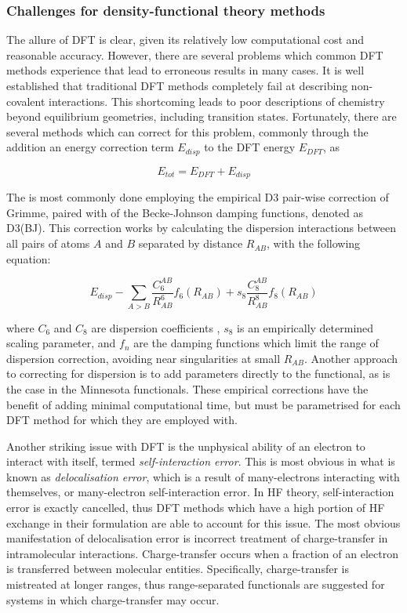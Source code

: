 \subsubsection{Challenges for density-functional theory methods}

The allure of DFT is clear, given its relatively low computational cost and reasonable accuracy. However, there are several problems which common DFT methods experience that lead to erroneous results in many cases.\cite{Cohen2012} It is well established that traditional DFT methods completely fail at describing non-covalent interactions.\cite{DiLabio2016} This shortcoming leads to poor descriptions of chemistry beyond equilibrium geometries, including transition states. Fortunately, there are several methods which can correct for this problem, commonly through the addition an energy correction term $E_{disp}$ to the DFT energy $E_{DFT}$, as

\begin{equation}
  E_{tot} = E_{DFT} + E_{disp}
\end{equation}

\noindent The is most commonly done employing the empirical D3 pair-wise correction of Grimme,\cite{Grimme2010} paired with of the Becke-Johnson damping functions,\cite{Johnson2006} denoted as D3(BJ). This correction works by calculating the dispersion interactions between all pairs of atoms $A$ and $B$ separated by distance $R_{AB}$, with the following equation:

\begin{equation}
  E_{disp} - \sum_{A>B} \frac{C_6^{AB}}{R_{AB}^6} f_6(R_{AB}) + s_8
  \frac{C_8^{AB}}{R_{AB}^8} f_8(R_{AB})
\end{equation}

\noindent where $C_6$ and $C_8$ are dispersion coefficients , $s_8$ is an empirically determined scaling parameter, and $f_n$ are the damping functions which limit the range of dispersion correction, avoiding near singularities at small $R_{AB}$. Another approach to correcting for dispersion is to add parameters directly to the functional, as is the case in the Minnesota functionals.\cite{Zhao2006,Zhao2006} These empirical corrections have the benefit of adding minimal computational time, but must be parametrised for each DFT method for which they are employed with.

Another striking issue with DFT is the unphysical ability of an electron to interact with itself, termed \emph{self-interaction error}. This is most obvious in what is known as \emph{delocalisation error}, which is a result of many-electrons interacting with themselves, or many-electron self-interaction error. In HF theory, self-interaction error is exactly cancelled, thus DFT methods which have a high portion of HF exchange in their formulation are able to account for this issue. The most obvious manifestation of delocalisation error is incorrect treatment of charge-transfer in intramolecular interactions.\cite{MoriSanchez2008,OterodelaRoza2014} Charge-transfer occurs when a fraction of an electron is transferred between molecular entities. Specifically, charge-transfer is mistreated at longer ranges, thus range-separated functionals are suggested for systems in which charge-transfer may occur.

